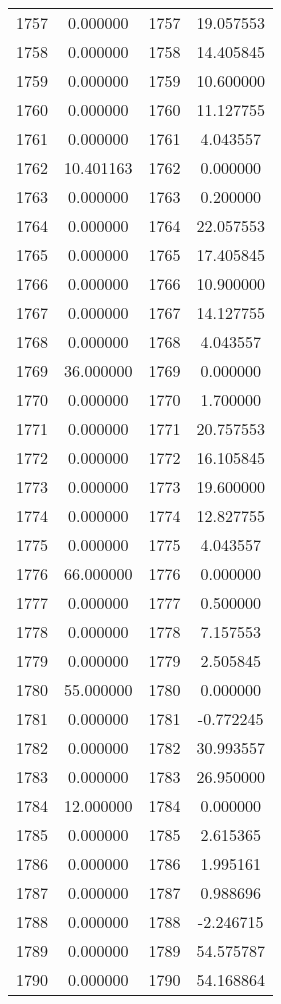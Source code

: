 \documentclass[12pt]{article}
\begin{document}
\begin{longtable}{@{}cccc@{}}
1757 & 0.000000 & 1757 & 19.057553 \\
1758 & 0.000000 & 1758 & 14.405845 \\
1759 & 0.000000 & 1759 & 10.600000 \\
1760 & 0.000000 & 1760 & 11.127755 \\
1761 & 0.000000 & 1761 & 4.043557 \\
1762 & 10.401163 & 1762 & 0.000000 \\
1763 & 0.000000 & 1763 & 0.200000 \\
1764 & 0.000000 & 1764 & 22.057553 \\
1765 & 0.000000 & 1765 & 17.405845 \\
1766 & 0.000000 & 1766 & 10.900000 \\
1767 & 0.000000 & 1767 & 14.127755 \\
1768 & 0.000000 & 1768 & 4.043557 \\
1769 & 36.000000 & 1769 & 0.000000 \\
1770 & 0.000000 & 1770 & 1.700000 \\
1771 & 0.000000 & 1771 & 20.757553 \\
1772 & 0.000000 & 1772 & 16.105845 \\
1773 & 0.000000 & 1773 & 19.600000 \\
1774 & 0.000000 & 1774 & 12.827755 \\
1775 & 0.000000 & 1775 & 4.043557 \\
1776 & 66.000000 & 1776 & 0.000000 \\
1777 & 0.000000 & 1777 & 0.500000 \\
1778 & 0.000000 & 1778 & 7.157553 \\
1779 & 0.000000 & 1779 & 2.505845 \\
1780 & 55.000000 & 1780 & 0.000000 \\
1781 & 0.000000 & 1781 & -0.772245 \\
1782 & 0.000000 & 1782 & 30.993557 \\
1783 & 0.000000 & 1783 & 26.950000 \\
1784 & 12.000000 & 1784 & 0.000000 \\
1785 & 0.000000 & 1785 & 2.615365 \\
1786 & 0.000000 & 1786 & 1.995161 \\
1787 & 0.000000 & 1787 & 0.988696 \\
1788 & 0.000000 & 1788 & -2.246715 \\
1789 & 0.000000 & 1789 & 54.575787 \\
1790 & 0.000000 & 1790 & 54.168864 \\

\end{longtable}
\end{document}
